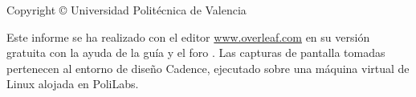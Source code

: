 \thispagestyle{empty}
{\small
\strut\vfill %
\noindent Copyright \copyright{} Universidad Politécnica de Valencia\par
\vspace{0.2cm}
\noindent Este informe se ha realizado con el editor \url{www.overleaf.com} en su versión gratuita con la ayuda de la guía \cite{Guide} y el foro \cite{Stack}. Las capturas de pantalla tomadas pertenecen al entorno de diseño Cadence, ejecutado sobre una máquina virtual de Linux alojada en PoliLabs.
}
\clearpage